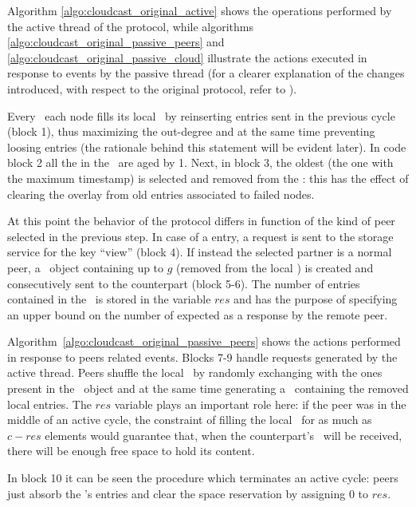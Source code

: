 Algorithm \ref{algo:cloudcast_original_active} shows the operations
performed by the active thread of the protocol, while algorithms
\ref{algo:cloudcast_original_passive_peers} and
\ref{algo:cloudcast_original_passive_cloud} illustrate the actions
executed in response to events by the passive thread (for a clearer
explanation of the changes introduced, with respect to the original
\cyclon protocol, refer to \cite{Cloudcast}).



Every \deltacyclon\ each node fills its local \view\ by reinserting
entries sent in the previous cycle (block 1), thus
maximizing the out-degree and at the same time preventing loosing
entries (the rationale behind this statement will be evident later).
In code block 2 all the \descriptors in the \view\ are aged
by 1. Next, in block 3, the oldest \descriptor (the one with
the maximum timestamp) is selected and removed from the \view: this
has the effect of clearing the overlay from old entries associated to
failed nodes.

At this point the behavior of the protocol differs in function of the kind
of peer selected in the previous step. In case of a \cloud entry, a
request is sent to the storage service for the key ``view''
(block 4). If instead the selected partner is a normal peer,
a \request\ object containing up to $g$ \descriptors (removed from the
local \view) is created and consecutively sent to the counterpart
(block 5-6). The number of entries contained in
the \request\ is stored in the variable $res$ and has the purpose of
specifying an upper bound on the number of \descriptors expected as a
response by the remote peer.

Algorithm~\ref{algo:cloudcast_original_passive_peers} shows the actions
performed in response to peers related
events. Blocks 7-9 handle requests generated by
the active thread. Peers shuffle the local \view\ by randomly exchanging
\descriptors with the ones present in the \request\ object
and at the same time generating a \reply\ containing the removed local
entries. The $res$ variable plays an important role here: if the peer
was in the middle of an active cycle, the constraint of filling the
local \view\ for as much as $c - res$ elements would guarantee that, when
the counterpart's \reply\ will be received, there will be enough free
space to hold its content.

In block 10 it can be seen the procedure which terminates an
active cycle: peers just absorb the \reply's entries and clear the
space reservation by assigning 0 to $res$.

